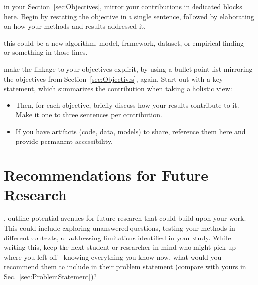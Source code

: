  in your Section~\ref{sec:Objectives}, mirror your contributions in dedicated blocks here.
Begin by restating the objective in a single sentence, followed by elaborating on how your methods and results addressed it.


 this could be a new algorithm, model, framework, dataset, or empirical finding - or something in those lines.


 make the linkage to your objectives explicit, by using a bullet point list mirroring the objectives from Section~\ref{sec:Objectives}, again.
Start out with a key statement, which summarizes the contribution when taking a holistic view: 
\begin{itemize}
  \item Then, for each objective, briefly discuss how your results contribute to it. Make it one to three sentences per contribution.
  \item If you have artifacts (code, data, models) to share, reference them here and provide permanent accessibility.
\end{itemize}








\section{Recommendations for Future Research}\label{sec:FutureResearch}


, outline potential avenues for future research that could build upon your work.
This could include exploring unanswered questions, testing your methods in different contexts, or addressing limitations identified in your study. 
While writing this, keep the next student or researcher in mind who might pick up where you left off 
- knowing everything you know now, what would you recommend them to include in their problem statement (compare with yours in Sec.~\ref{sec:ProblemStatement})?  
